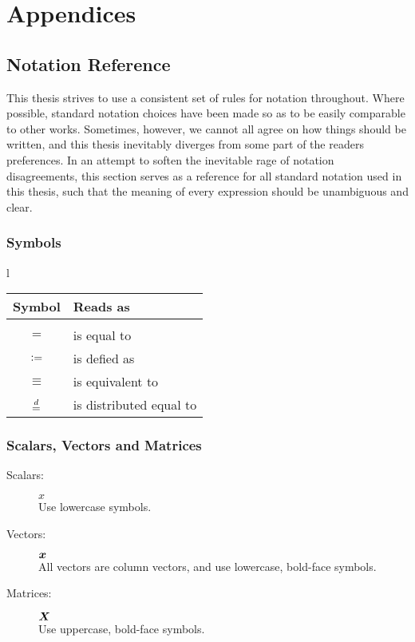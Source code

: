 \documentclass[Thesis.tex]{subfiles}
\begin{document}
\chapter{Appendices}
\renewcommand{\thesection}{\Alph{section}}
\renewcommand{\thesubsection}{\Alph{section}.\Roman{subsection}}

\section{Notation Reference}

This thesis strives to use a consistent set of rules for notation throughout.
Where possible, standard notation choices have been made so as to be easily
comparable to other works. Sometimes, however, we cannot all agree on how things
should be written, and this thesis inevitably diverges from some part of the
readers preferences. In an attempt to soften the inevitable rage of notation
disagreements, this section serves as a reference for all standard
notation used in this thesis, such that the meaning of every expression should
be unambiguous and clear.

\subsection{Symbols}l
\begin{center}
\begin{tabular}{cl}
  Symbol & Reads as\\
  \hline\\
  $=$ & is equal to\\
  $\vcentcolon=$ & is defied as\\
  $\equiv$ & is equivalent to\\
  $\overset{d}{=}$ & is distributed equal to
\end{tabular}
\end{center}

\subsection{Scalars, Vectors and Matrices}

\begin{description}
\item[Scalars:] $x$\hfill\\
  Use lowercase symbols.
\item[Vectors:] $\bm{x}$ \hfill\\
  All vectors are column vectors, and use lowercase, bold-face symbols.
\item[Matrices:] $\bm{X}$ \hfill \\
  Use uppercase, bold-face symbols.
\end{description}
\end{document}
